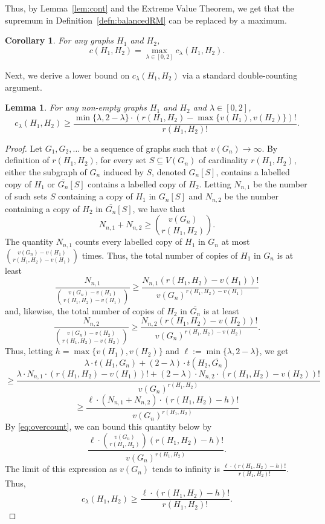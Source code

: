 \documentclass[12pt]{article}
\numberwithin{equation}{section}
\newtheorem{cor}[equation]{Corollary}
\newtheorem{lem}[equation]{Lemma}
\theoremstyle{definition}
\theoremstyle{remark}
\begin{document}
Thus, by Lemma~\ref{lem:cont} and the Extreme Value Theorem, we get that the supremum in Definition~\ref{defn:balancedRM} can be replaced by a maximum.

\begin{cor}
\label{cor:max} 
For any graphs $H_1$ and $H_2$, 
\[c(H_1,H_2)=\max_{\lambda\in[0,2]}c_\lambda(H_1,H_2).\]
\end{cor}

Next, we derive a lower bound on $c_\lambda(H_1,H_2)$ via a standard double-counting argument.

\begin{lem}
\label{lem:trivialLower}
For any non-empty graphs $H_1$ and $H_2$ and $\lambda\in[0,2]$,
\[c_\lambda(H_1,H_2)\geq \frac{\min\{\lambda,2-\lambda\}\cdot(r(H_1,H_2)-\max\{v(H_1),v(H_2)\})!}{r(H_1,H_2)!}.\]
\end{lem}

\begin{proof}
Let $G_1,G_2,\dots$ be a sequence of graphs such that $v(G_n)\to\infty$. By definition of $r(H_1,H_2)$, for every set $S\subseteq V(G_n)$ of cardinality $r(H_1,H_2)$, either the subgraph of $G_n$ induced by $S$, denoted $G_n[S]$, contains a labelled copy of $H_1$ or $\overline{G_n}[S]$ contains a labelled copy of $H_2$. Letting $N_{n,1}$ be the number of such sets $S$ containing a copy of $H_1$ in $G_n[S]$ and $N_{n,2}$ be the number containing a copy of $H_2$ in $\overline{G_n}[S]$, we have that
\begin{equation}\label{eq:overcount}N_{n,1} + N_{n,2}\geq \binom{v(G_n)}{r(H_1,H_2)}.\end{equation}
The quantity $N_{n,1}$ counts every labelled copy of $H_1$ in $G_n$ at most $\binom{v(G_n)-v(H_1)}{r(H_1,H_2)-v(H_1)}$ times. Thus, the total number of copies of $H_1$ in $G_n$ is at least
\[\frac{N_{n,1}}{\binom{v(G_n)-v(H_1)}{r(H_1,H_2)-v(H_1)}}\geq\frac{N_{n,1}(r(H_1,H_2)-v(H_1))!}{v(G_n)^{r(H_1,H_2)-v(H_1)}}\]
and, likewise, the total number of copies of $H_2$ in $\overline{G_n}$ is at least
\[\frac{N_{n,2}}{\binom{v(G_n)-v(H_2)}{r(H_1,H_2)-v(H_2)}}\geq \frac{N_{n,2}(r(H_1,H_2)-v(H_2))!}{v(G_n)^{r(H_1,H_2)-v(H_2)}}.\]
Thus, letting $h=\max\{v(H_1),v(H_2)\}$ and $\ell:=\min\{\lambda,2-\lambda\}$, we get
\[\lambda\cdot t(H_1,G_n) + (2-\lambda)\cdot t(H_2,\overline{G_n})\]
\[\geq \frac{\lambda\cdot N_{n,1}\cdot(r(H_1,H_2)-v(H_1))! + (2-\lambda)\cdot N_{n,2}\cdot(r(H_1,H_2)-v(H_2))!}{v(G_n)^{r(H_1,H_2)}}\]
\[\geq \frac{\ell\cdot \left(N_{n,1}+N_{n,2}\right)\cdot (r(H_1,H_2)-h)! }{v(G_n)^{r(H_1,H_2)}}\]
By \eqref{eq:overcount}, we can bound this quantity below by 
\[\frac{\ell\cdot \binom{v(G_n)}{r(H_1,H_2)}(r(H_1,H_2)-h)!}{v(G_n)^{r(H_1,H_2)}}.\]
The limit of this expression as $v(G_n)$ tends to infinity is $\frac{\ell\cdot (r(H_1,H_2)-h)!}{r(H_1,H_2)!}$. Thus, 
\[c_\lambda(H_1,H_2)\geq\frac{\ell\cdot(r(H_1,H_2)-h)!}{r(H_1,H_2)!}.\]
\end{proof}
\end{document}
